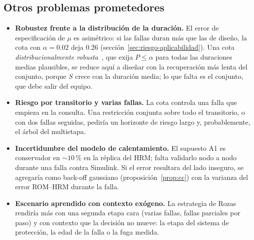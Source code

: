 \subsection{Otros problemas prometedores}
\begin{itemize}
  \item \textbf{Robustez frente a la distribución de la duración.} El error de especificación de
        $\mu$ es asimétrico: si las fallas duran más que las de diseño, la cota con $\alpha=0.02$
        deja 0.26 (sección~\ref{sec:riesgo-aplicabilidad}). Una cota \emph{distribucionalmente
        robusta}~\cite{delage2010}, que exija $P\le\alpha$ para todas las duraciones medias
        plausibles, se reduce aquí a diseñar con la recuperación más lenta del conjunto, porque
        $S$ crece con la duración media; lo que falta es el conjunto, que debe salir del equipo.
  \item \textbf{Riesgo por transitorio y varias fallas.} La cota controla una falla que empieza en
        la consulta. Una restricción conjunta sobre todo el transitorio, o con dos fallas seguidas,
        pediría un horizonte de riesgo largo y, probablemente, el árbol del multietapa.
  \item \textbf{Incertidumbre del modelo de calentamiento.} El supuesto A1 es conservador en
        $\sim10$\,\% en la réplica del HRM; falta validarlo nodo a nodo durante una falla contra
        Simulink. Si el error resultara del lado inseguro, se agregaría como back-off gaussiano
        (proposición~\ref{prop:cc}) con la varianza del error ROM--HRM durante la falla.
  \item \textbf{Escenario aprendido con contexto exógeno.} La estrategia de Rozas rendiría más con
        una segunda etapa cara (varias fallas, fallas parciales por paso) y con contexto que la
        decisión no mueve: la etapa del sistema de protección, la edad de la falla o la fuga
        medida.
\end{itemize}

